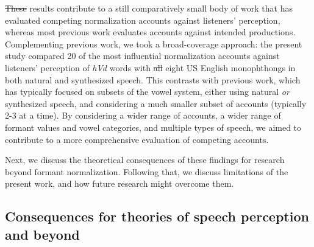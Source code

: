 \documentclass[preprint]{JASA}
\providecommand{\DIFadd}[1]{{\protect\color{blue}\uwave{#1}}} %
\providecommand{\DIFdel}[1]{{\protect\color{red}\sout{#1}}}                      %
\providecommand{\DIFaddbegin}{} %
\providecommand{\DIFaddend}{} %
\providecommand{\DIFdelbegin}{} %
\providecommand{\DIFdelend}{} %
\begin{document}
\DIFdelbegin \DIFdel{These }\DIFdelend \DIFaddbegin \DIFadd{The }\DIFaddend results contribute to a still comparatively small body of work that has evaluated competing normalization accounts against listeners' perception, whereas most previous work evaluates accounts against intended productions. Complementing previous work, we took a broad-coverage approach: the present study compared 20 of the most influential normalization accounts against listeners' perception of \emph{hVd} words with \DIFdelbegin \DIFdel{all }\DIFdelend eight US English monophthongs in both natural and synthesized speech. This contrasts with previous work, which has typically focused on subsets of the vowel system, either using natural \emph{or} synthesized speech, and considering a much smaller subset of accounts (typically 2-3 at a time). By considering a wider range of accounts, a wider range of formant values and vowel categories, and multiple types of speech, we aimed to contribute to a more comprehensive evaluation of competing accounts.

Next, we discuss the theoretical consequences of these findings for research beyond formant normalization. Following that, we discuss limitations of the present work, and how future research might overcome them.

\subsection{Consequences for theories of speech perception and beyond}\label{consequences-for-theories-of-speech-perception-and-beyond}
\end{document}
